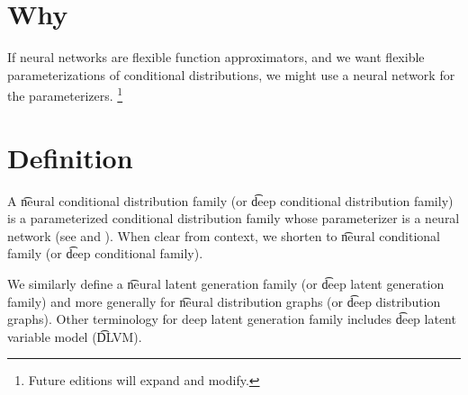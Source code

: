
\section*{Why}

If neural networks are flexible function approximators, and we want flexible parameterizations of conditional distributions, we might use a neural network for the parameterizers.
    \ifhmode\unskip\fi\footnote{
Future editions will expand and modify.
    }

\section*{Definition}

A \t{neural conditional distribution family} (or \t{deep conditional distribution family}) is a parameterized conditional distribution family whose parameterizer is a neural network (see  and ).
When clear from context, we shorten to \t{neural conditional family} (or \t{deep conditional family}).

We similarly define a \t{neural latent generation family} (or \t{deep latent generation family}) and more generally for \t{neural distribution graphs} (or \t{deep distribution graphs}).
Other terminology for deep latent generation family includes \t{deep latent variable model} (\t{DLVM}).

\blankpage
